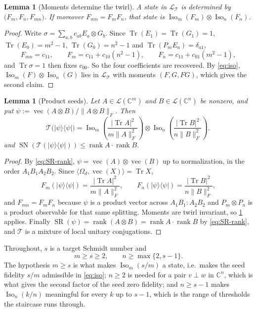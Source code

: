 \documentclass[11pt,reqno]{amsart}
\theoremstyle{plain}
\newtheorem{lemma}[theorem]{Lemma}
\theoremstyle{remark}
\DeclareMathOperator{\Tr}{Tr}
\DeclareMathOperator{\rank}{rank}
\DeclareMathOperator{\SN}{SN}
\DeclareMathOperator{\SR}{SR}
\DeclareMathOperator{\vecop}{vec}
\DeclareMathOperator{\Iso}{Iso}
\newcommand{\cL}{\mathcal L}
\newcommand{\cT}{\mathcal T}
\newcommand{\ketbra}[2]{\lvert #1\rangle\!\langle #2\rvert}
\newcommand{\ip}[2]{\langle #1,#2\rangle}
\newcommand{\norm}[1]{\lVert #1\rVert}
\newcommand{\abs}[1]{\lvert #1\rvert}
\newcommand{\C}{\mathbb C}
\begin{document}
\begin{lemma}[Moments determine the twirl]
\label{lem:moments}
A state in $\cL_{\cT}$ is determined by
$\bigl(F_m,F_n,F_{mn}\bigr)$.  If moreover $F_{mn}=F_mF_n$, that state is
$\Iso_m(F_m)\otimes\Iso_n(F_n)$.
\end{lemma}

\begin{proof}
Write $\sigma=\sum_{a,b}c_{ab}E_a\otimes G_b$.  Since $\Tr(E_1)=\Tr(G_1)=1$,
$\Tr(E_0)=m^2-1$, $\Tr(G_0)=n^2-1$ and $\Tr(P_mE_a)=\delta_{a1}$,
\[
    F_{mn}=c_{11},
    \qquad
    F_m=c_{11}+c_{10}(n^2-1),
    \qquad
    F_n=c_{11}+c_{01}(m^2-1),
\]
and $\Tr\sigma=1$ then fixes $c_{00}$.  So the four coefficients are recovered.
By \cref{eq:iso}, $\Iso_m(F)\otimes\Iso_n(G)$ lies in $\cL_{\cT}$ with moments
$(F,G,FG)$, which gives the second claim.
\end{proof}

\begin{lemma}[Product seeds]
\label{lem:seed}
Let $A\in\cL(\C^m)$ and $B\in\cL(\C^n)$ be nonzero, and put
$\psi:=\vecop(A\otimes B)/\norm{A\otimes B}_F$.  Then
\[
    \cT\bigl(\ketbra\psi\psi\bigr)
    =\Iso_m\!\left(\frac{\abs{\Tr A}^2}{m\norm A_F^2}\right)
     \otimes
     \Iso_n\!\left(\frac{\abs{\Tr B}^2}{n\norm B_F^2}\right),
\]
and $\SN(\cT(\ketbra\psi\psi))\le\rank A\cdot\rank B$.
\end{lemma}

\begin{proof}
By \cref{eq:SR-rank}, $\psi=\vecop(A)\otimes\vecop(B)$ up to normalization, in
the order $A_1B_1A_2B_2$.  Since $\ip{\Omega_d}{\vecop(X)}=\Tr X$,
\[
    F_m(\ketbra\psi\psi)=\frac{\abs{\Tr A}^2}{m\norm A_F^2},
    \qquad
    F_n(\ketbra\psi\psi)=\frac{\abs{\Tr B}^2}{n\norm B_F^2},
\]
and $F_{mn}=F_mF_n$ because $\psi$ is a product vector across $A_1B_1:A_2B_2$
and $P_m\otimes P_n$ is a product observable for that same splitting.  Moments
are twirl invariant, so \cref{lem:moments} applies.  Finally
$\SR(\psi)=\rank(A\otimes B)=\rank A\cdot\rank B$ by \cref{eq:SR-rank}, and
$\cT$ is a mixture of local unitary conjugations.
\end{proof}

Throughout, $s$ is a target Schmidt number and
\begin{equation}
\label{eq:hyp}
    m\ge s\ge2,
    \qquad
    n\ge\max\{2,s-1\}.
\end{equation}
The hypothesis $m\ge s$ is what makes $\Iso_m(s/m)$ a state, i.e.\ makes the
seed fidelity $s/m$ admissible in \cref{eq:iso}; $n\ge2$ is needed for a pair
$v\perp w$ in $\C^n$, which is what gives the second factor of the seed zero
fidelity; and $n\ge s-1$ makes $\Iso_n(k/n)$ meaningful for every $k$ up to
$s-1$, which is the range of thresholds the staircase runs through.
\end{document}
